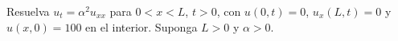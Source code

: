 Resuelva $u_t=\alpha^2u_{xx}$ para $0<x<L$, $t>0$, con $u(0,t)=0$, $u_x(L,t)=0$ y $u(x,0)=100$ en el interior. Suponga $L>0$ y $\alpha>0$.
